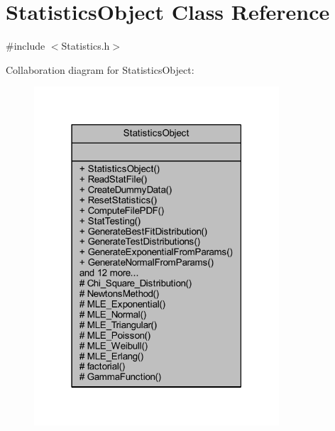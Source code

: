 \hypertarget{class_statistics_object}{}\section{Statistics\+Object Class Reference}
\label{class_statistics_object}


{\ttfamily \#include $<$Statistics.\+h$>$}



Collaboration diagram for Statistics\+Object\+:
\nopagebreak
\begin{figure}[H]
\begin{center}
\leavevmode
\includegraphics[width=259pt]{class_statistics_object__coll__graph}
\end{center}
\end{figure}
